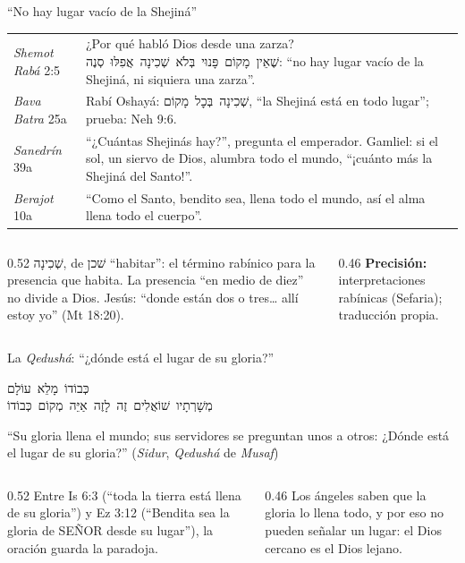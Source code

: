 \documentclass[hyperref={bookmarks=false},aspectratio=169]{beamer}
\newcommand{\heb}[1]{\mbox{\foreignlanguage{hebrew}{#1}}}
\newcommand{\SENOR}{S{\fontsize{0.78em}{1em}\selectfont EÑOR}}
\newcommand{\precision}[1]{{\footnotesize\color{gris}\textbf{Precisión:} #1}}
\begin{document}
\begin{frame}{``No hay lugar vacío de la Shejiná''}
\scriptsize\renewcommand{\arraystretch}{1.18}
\begin{tabular}{@{}>{\RaggedRight\arraybackslash}p{2.3cm}>{\RaggedRight\arraybackslash}p{9.5cm}@{}}
\toprule
\emph{Shemot Rabá} 2:5 & ¿Por qué habló Dios desde una zarza? \heb{שֶׁאֵין מָקוֹם פָּנוּי בְּלֹא שְׁכִינָה אֲפִלּוּ סְנֶה}: ``no hay lugar vacío de la Shejiná, ni siquiera una zarza''. \\
\emph{Bava Batra} 25a & Rabí Oshayá: \heb{שְׁכִינָה בְּכׇל מָקוֹם}, ``la Shejiná está en todo lugar''; prueba: Neh 9:6. \\
\emph{Sanedrín} 39a & ``¿Cuántas Shejinás hay?'', pregunta el emperador. Gamliel: si el sol, un siervo de Dios, alumbra todo el mundo, ``¡cuánto más la Shejiná del Santo!''. \\
\emph{Berajot} 10a & ``Como el Santo, bendito sea, llena todo el mundo, así el alma llena todo el cuerpo''. \\
\bottomrule
\end{tabular}\par\medskip
\begin{columns}[t,onlytextwidth]
\begin{column}{0.52\textwidth}\small
\heb{שְׁכִינָה}, de \heb{שׁכן} ``habitar'': el término rabínico para la presencia que habita. La presencia ``en medio de diez'' no divide a Dios. Jesús: ``donde están dos o tres\ldots{} allí estoy yo'' (Mt 18:20).
\end{column}
\begin{column}{0.46\textwidth}
\precision{interpretaciones rabínicas (Sefaria); traducción propia.}
\end{column}
\end{columns}
\end{frame}

\begin{frame}{La \emph{Qedushá}: ``¿dónde está el lugar de su gloria?''}
\begin{center}\heb{כְּבוֹדוֹ מָלֵא עוֹלָם}\\[2pt]\heb{מְשָׁרְתָיו שׁוֹאֲלִים זֶה לָזֶה אַיֵּה מְקוֹם כְּבוֹדוֹ}\end{center}
\begin{tcolorbox}[colback=papiro,colframe=dorado,boxrule=1.2pt,arc=3pt]
\small ``Su gloria llena el mundo; sus servidores se preguntan unos a otros: ¿Dónde está el lugar de su gloria?'' (\emph{Sidur}, \emph{Qedushá} de \emph{Musaf})
\end{tcolorbox}
\begin{columns}[t,onlytextwidth]
\begin{column}{0.52\textwidth}\small
Entre Is 6:3 (``toda la tierra está llena de su gloria'') y Ez 3:12 (``Bendita sea la gloria de \SENOR{} desde su lugar''), la oración guarda la paradoja.
\end{column}
\begin{column}{0.46\textwidth}\small
Los ángeles saben que la gloria lo llena todo, y por eso no pueden señalar un lugar: el Dios cercano es el Dios lejano.
\end{column}
\end{columns}
\end{frame}
\end{document}
